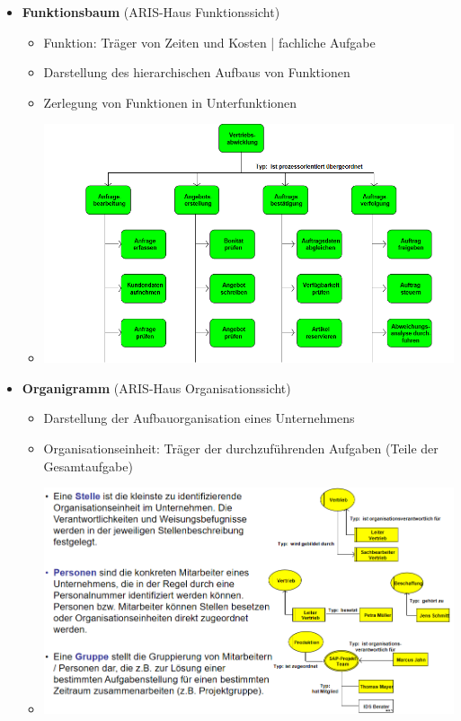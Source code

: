 \documentclass[11pt,a4paper]{article}
\begin{document}
\begin{itemize}
	\pagebreak
	
	\item \textbf{Funktionsbaum} (ARIS-Haus Funktionssicht)
		\begin{itemize}
		\item Funktion: Träger von Zeiten und Kosten | fachliche Aufgabe
		\item Darstellung des hierarchischen Aufbaus von Funktionen
		\item Zerlegung von Funktionen in Unterfunktionen
		\item[] \includegraphics[width=15cm]{funktionen}
		\end{itemize}
		
	\item \textbf{Organigramm} (ARIS-Haus Organisationssicht)
		\begin{itemize}
		\item Darstellung der Aufbauorganisation eines Unternehmens
		\item Organisationseinheit: Träger der durchzuführenden Aufgaben (Teile der Gesamtaufgabe)
		\item[] \includegraphics[width=15cm]{organi}
		\end{itemize}
	

\end{itemize}
\end{document}
